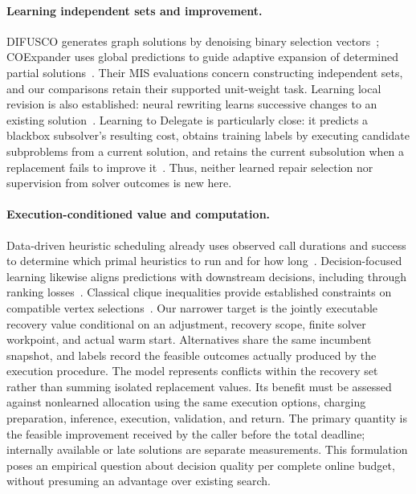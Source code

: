 \paragraph{Learning independent sets and improvement.}
DIFUSCO generates graph solutions by denoising binary selection
vectors~\cite{sun2023difusco}; COExpander uses global predictions to guide
adaptive expansion of determined partial
solutions~\cite{ma2025coexpander}. Their MIS evaluations concern constructing
independent sets, and our comparisons retain their supported unit-weight
task. Learning local revision is also established: neural rewriting
learns successive changes to an existing
solution~\cite{chen2019}. Learning to Delegate is particularly close: it
predicts a blackbox subsolver's resulting cost, obtains training labels by
executing candidate subproblems from a current solution, and retains the
current subsolution when a replacement fails to
improve it~\cite{li2021delegate}. Thus, neither learned repair selection nor
supervision from solver outcomes is new here.

\paragraph{Execution-conditioned value and computation.}
Data-driven heuristic scheduling already uses observed call durations and
success to determine which primal heuristics to run and for how
long~\cite{chmiela2021schedule}. Decision-focused learning likewise aligns
predictions with downstream decisions, including through ranking
losses~\cite{mandi2022rank}. Classical clique inequalities provide established
constraints on compatible vertex selections~\cite{chvatal1975polytopes}.
Our narrower target is the jointly executable recovery value conditional
on an adjustment, recovery scope, finite solver workpoint, and actual warm
start. Alternatives share the same incumbent snapshot, and labels record
the feasible outcomes actually produced by the execution procedure.
The model represents conflicts within the recovery set rather than summing
isolated replacement values. Its benefit must be assessed against
nonlearned allocation using the same execution options, charging preparation, inference,
execution, validation, and return. The primary quantity is the feasible
improvement received by the caller before the total deadline; internally
available or late solutions are separate measurements. This formulation
poses an empirical question about decision quality per complete online
budget, without presuming an advantage over existing search.
